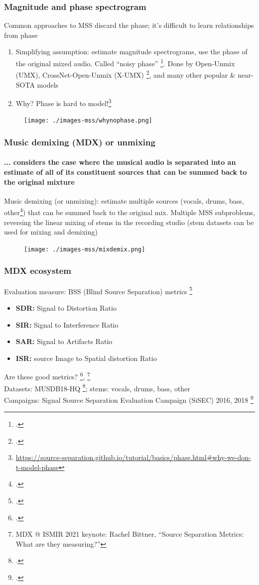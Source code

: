 \documentclass[usenames,dvipsnames]{beamer}
\begin{document}
\begin{frame}
	\frametitle{Magnitude and phase spectrogram}
	Common approaches to MSS discard the phase; it's difficult to learn relationships from phase
	\begin{enumerate}
		\item
			Simplifying assumption: estimate magnitude spectrograms, use the phase of the original mixed audio. Called ``noisy phase'' \footcite{noisyphase1}. Done by Open-Unmix (UMX), CrossNet-Open-Unmix (X-UMX) \footcite{umx, xumx}, and many other popular \& near-SOTA models
		\item
			Why? Phase is hard to model!\footnote{\url{https://source-separation.github.io/tutorial/basics/phase.html\#why-we-don-t-model-phase}}
	\end{enumerate}
	\begin{figure}
		\vspace{-0.5em}
	\centering
	\texttt{[image: ./images-mss/whynophase.png]}
	\end{figure}
\end{frame}

\begin{frame}
	\frametitle{Music demixing (MDX) or unmixing}
	\framesubtitle{... considers the case where the musical audio is separated into an estimate of all of its constituent sources that can be summed back to the original mixture}
	Music demixing (or unmixing): estimate multiple sources (vocals, drums, bass, other\footcite{musdb18hq}) that can be summed back to the original mix. Multiple MSS subproblems, reversing the linear mixing of stems in the recording studio (stem datasets can be used for mixing and demixing)
	\begin{figure}[ht]
		\centering
		\texttt{[image: ./images-mss/mixdemix.png]}
	\end{figure}
\end{frame}

\begin{frame}
	\frametitle{MDX ecosystem}
	Evaluation measure: BSS (Blind Source Separation) metrics \footcite{bss, bss2}
	\begin{itemize}
	\item
		\textbf{SDR:} Signal to Distortion Ratio
	\item
		\textbf{SIR:} Signal to Interference Ratio
	\item
		\textbf{SAR:} Signal to Artifacts Ratio
	\item
		\textbf{ISR:} source Image to Spatial distortion Ratio
	\end{itemize}
	Are these good metrics? \footcite{roux2018sdr}, \footnote{MDX @ ISMIR 2021 keynote: Rachel Bittner, ``Source Separation Metrics: What are they measuring?''}\\
	Datasets: MUSDB18-HQ \footcite{musdb18, musdb18hq}; stems: vocals, drums, bass, other\\
	Campaigns: Signal Source Separation Evaluation Campaign (SiSEC) 2016, 2018 \footcite{sisec2016, sisec2018}\\
\end{frame}
\end{document}
